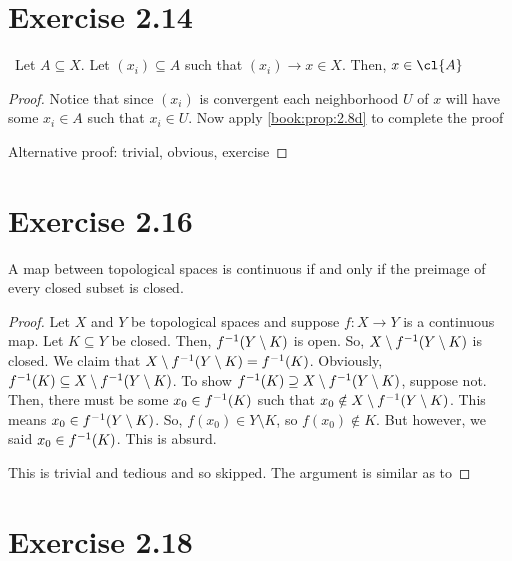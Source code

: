 \documentclass{article}
\begin{document}
\section{Exercise 2.14}
\begin{proposition}
    \topospace \, Let $A \subseteq X$. Let $(x_i) \subseteq A$
    such that $(x_i) \to x \in X$. Then, $x \in \cl{A}$
\end{proposition}

\begin{proof}
     Notice that since $(x_i)$ is convergent each
    neighborhood $U$ of $x$ will have some $x_i \in A$ such that $x_i \in U$.
    Now apply \cref{book:prop:2.8d} to complete the proof

    Alternative proof: trivial, obvious, exercise
\end{proof}

\section{Exercise 2.16}

\begin{proposition}
\label{book:prop:2.15}
A map between topological spaces is continuous if and only if the preimage of every closed subset is closed.
\end{proposition}

\begin{proof}
    \forwarddir Let $X$ and $Y$ be topological spaces and suppose $f: X \to Y$ is a continuous map.
    Let $K \subseteq Y$ be closed. Then, $f^{-1}(Y \setminus K)$
    is open. So, $X \setminus f^{-1}(Y \setminus K)$ is closed.
    We claim that $X \setminus f^{-1}(Y \setminus K) = f^{-1}(K)$. Obviously, $f^{-1}(K) \subseteq X \setminus f^{-1}(Y \setminus K)$.
    To show $f^{-1}(K) \supseteq X \setminus f^{-1}(Y \setminus K)$, suppose not. Then, there must be some $x_0 \in f^{-1}(K)$ such that $x_0 \notin X \setminus f^{-1}(Y \setminus K)$. This means $x_0 \in f^{-1}(Y\setminus K)$.
    So, $f(x_0) \in Y \setminus K$, so $f(x_0) \notin K$.
    But however, we said $x_0 \in f^{-1}(K)$. This is absurd.

    \conversedir This is trivial and tedious and so skipped.
    The argument is similar as to \forwarddir
    
\end{proof}

\section{Exercise 2.18}
\end{document}
